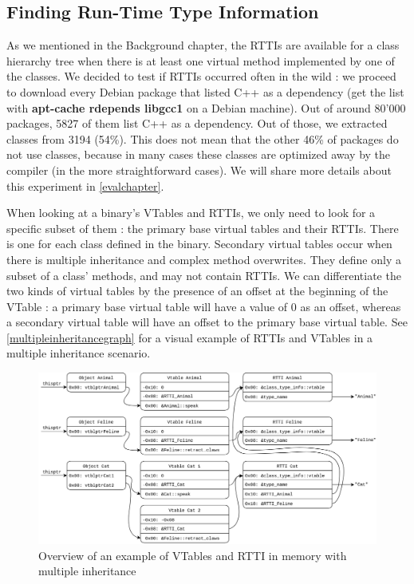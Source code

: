 \documentclass[a4paper,11pt,oneside]{report}
\begin{document}
\subsection{Finding Run-Time Type Information}

As we mentioned in the Background chapter, the RTTIs are available for a
class hierarchy tree when there is at least one virtual method implemented
by one of the classes.
We decided to test if RTTIs occurred often in the wild : we proceed to download 
every Debian package that listed C++ as a dependency (get the list with 
\textbf{apt-cache rdepends libgcc1} on a Debian machine).
Out of around 80'000 packages, 5827 of them list C++ as a dependency.
Out of those, we extracted classes from 3194 (54\%).
This does not mean that the other 46\% of packages do not use classes,
because in many cases these classes are optimized away by the compiler
(in the more straightforward cases).
We will share more details about this experiment in \autoref{evalchapter}.

When looking at a binary's VTables and RTTIs, we only need to look for a
specific subset of them : the primary base virtual tables and their RTTIs.
There is one for each class defined in the binary. Secondary virtual
tables occur when there is multiple inheritance and complex method overwrites.
They define only a subset of a class' methods, and may not contain RTTIs.
We can differentiate the two kinds of virtual tables by the presence of an
offset at the beginning of the VTable : a primary base virtual table will have
a value of $0$ as an offset, whereas a secondary virtual table will have an
offset to the primary base virtual table. See
\autoref{multipleinheritancegraph} for a visual example of RTTIs and VTables
in a multiple inheritance scenario.

\begin{figure}[h]

\includegraphics[width=16cm]{Feline.png}
\caption{Overview of an example of VTables and RTTI in memory with multiple 
inheritance}
\label{multipleinheritancegraph}

\end{figure}
\end{document}
